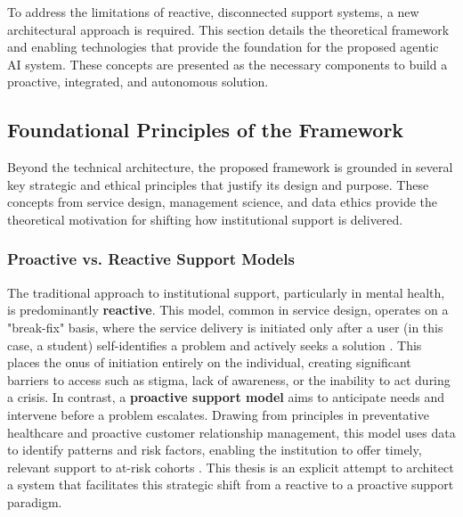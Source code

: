 To address the limitations of reactive, disconnected support systems, a new architectural approach is required. This section details the theoretical framework and enabling technologies that provide the foundation for the proposed agentic AI system. These concepts are presented as the necessary components to build a proactive, integrated, and autonomous solution.

\subsection{Foundational Principles of the Framework}
\label{subsec:foundational_principles}

Beyond the technical architecture, the proposed framework is grounded in several key strategic and ethical principles that justify its design and purpose. These concepts from service design, management science, and data ethics provide the theoretical motivation for shifting how institutional support is delivered.

\subsubsection{Proactive vs. Reactive Support Models}
The traditional approach to institutional support, particularly in mental health, is predominantly \textbf{reactive}. This model, common in service design, operates on a "break-fix" basis, where the service delivery is initiated only after a user (in this case, a student) self-identifies a problem and actively seeks a solution \cite{FIND_CITATION_PLEASE}. This places the onus of initiation entirely on the individual, creating significant barriers to access such as stigma, lack of awareness, or the inability to act during a crisis. In contrast, a \textbf{proactive support model} aims to anticipate needs and intervene before a problem escalates. Drawing from principles in preventative healthcare and proactive customer relationship management, this model uses data to identify patterns and risk factors, enabling the institution to offer timely, relevant support to at-risk cohorts \cite{FIND_CITATION_PLEASE}. This thesis is an explicit attempt to architect a system that facilitates this strategic shift from a reactive to a proactive support paradigm.


